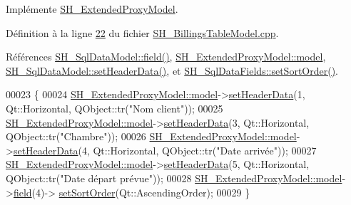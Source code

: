 Implémente \hyperlink{classSH__ExtendedProxyModel_ad6b7ea810aa00f42624253d77caafcbb}{S\-H\-\_\-\-Extended\-Proxy\-Model}.



Définition à la ligne \hyperlink{SH__BillingsTableModel_8cpp_source_l00022}{22} du fichier \hyperlink{SH__BillingsTableModel_8cpp_source}{S\-H\-\_\-\-Billings\-Table\-Model.\-cpp}.



Références \hyperlink{classSH__SqlDataModel_a92c51d5c1f6aca08a7ee566ece1e4cb6}{S\-H\-\_\-\-Sql\-Data\-Model\-::field()}, \hyperlink{classSH__ExtendedProxyModel_a8c8b8930c6b1abd9bbb1dce1fdc9690b}{S\-H\-\_\-\-Extended\-Proxy\-Model\-::model}, \hyperlink{classSH__SqlDataModel_aae31b72ec89a35a7b8d4175d7bcaa33a}{S\-H\-\_\-\-Sql\-Data\-Model\-::set\-Header\-Data()}, et \hyperlink{classSH__SqlDataFields_a32a7c040a081d39594245e1a4a68f70d}{S\-H\-\_\-\-Sql\-Data\-Fields\-::set\-Sort\-Order()}.


\begin{DoxyCode}
00023 \{
00024     \hyperlink{classSH__ExtendedProxyModel_a8c8b8930c6b1abd9bbb1dce1fdc9690b}{SH\_ExtendedProxyModel::model}->\hyperlink{classSH__SqlDataModel_aae31b72ec89a35a7b8d4175d7bcaa33a}{setHeaderData}(1, Qt::Horizontal,
       QObject::tr(\textcolor{stringliteral}{"Nom client"}));
00025     \hyperlink{classSH__ExtendedProxyModel_a8c8b8930c6b1abd9bbb1dce1fdc9690b}{SH\_ExtendedProxyModel::model}->\hyperlink{classSH__SqlDataModel_aae31b72ec89a35a7b8d4175d7bcaa33a}{setHeaderData}(3, Qt::Horizontal,
       QObject::tr(\textcolor{stringliteral}{"Chambre"}));
00026     \hyperlink{classSH__ExtendedProxyModel_a8c8b8930c6b1abd9bbb1dce1fdc9690b}{SH\_ExtendedProxyModel::model}->\hyperlink{classSH__SqlDataModel_aae31b72ec89a35a7b8d4175d7bcaa33a}{setHeaderData}(4, Qt::Horizontal,
       QObject::tr(\textcolor{stringliteral}{"Date arrivée"}));
00027     \hyperlink{classSH__ExtendedProxyModel_a8c8b8930c6b1abd9bbb1dce1fdc9690b}{SH\_ExtendedProxyModel::model}->\hyperlink{classSH__SqlDataModel_aae31b72ec89a35a7b8d4175d7bcaa33a}{setHeaderData}(5, Qt::Horizontal,
       QObject::tr(\textcolor{stringliteral}{"Date départ prévue"}));
00028     \hyperlink{classSH__ExtendedProxyModel_a8c8b8930c6b1abd9bbb1dce1fdc9690b}{SH\_ExtendedProxyModel::model}->\hyperlink{classSH__SqlDataModel_a92c51d5c1f6aca08a7ee566ece1e4cb6}{field}(4)->
      \hyperlink{classSH__SqlDataFields_a32a7c040a081d39594245e1a4a68f70d}{setSortOrder}(Qt::AscendingOrder);
00029 \}
\end{DoxyCode}


